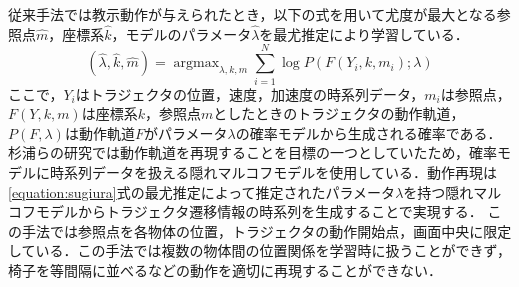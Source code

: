 従来手法では教示動作が与えられたとき，以下の式を用いて尤度が最大となる参照点$\hat{m}$，座標系$\hat{k}$，モデルのパラメータ$\hat{λ}$を最尤推定により学習している．
\begin{equation}
	\label{equation:sugiura}
	(\hat{λ} , \hat{k} , \hat{m}) = \mathop{\arg\max}_{λ , k , m}\sum_{i=1}^{N}\log P(F(Y_{i} , k , m_{i}) ; λ)
\end{equation}
ここで，$Y_{i}$はトラジェクタの位置，速度，加速度の時系列データ，$m_{i}$は参照点，$F(Y , k , m)$は座標系$k$，参照点$m$としたときのトラジェクタの動作軌道，$P(F,λ)$は動作軌道$F$がパラメータ$λ$の確率モデルから生成される確率である．杉浦らの研究では動作軌道を再現することを目標の一つとしていたため，確率モデルに時系列データを扱える隠れマルコフモデルを使用している．動作再現は\ref{equation:sugiura}式の最尤推定によって推定されたパラメータ$λ$を持つ隠れマルコフモデルからトラジェクタ遷移情報の時系列を生成することで実現する．
この手法では参照点を各物体の位置，トラジェクタの動作開始点，画面中央に限定している．この手法では複数の物体間の位置関係を学習時に扱うことができず，椅子を等間隔に並べるなどの動作を適切に再現することができない．